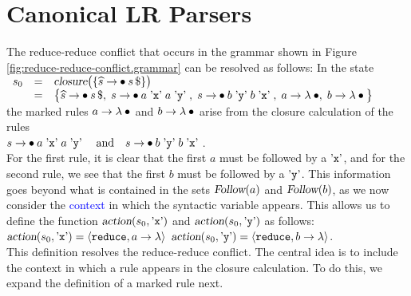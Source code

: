 \section{Canonical LR Parsers}
The reduce-reduce conflict that occurs in the grammar shown in Figure \ref{fig:reduce-reduce-conflict.grammar} can be resolved as follows: In the state
\\[0.2cm]
\hspace*{1.3cm}
$\begin{array}{lcl}
 s_0 & = & \textsl{closure}\bigl( \{ \widehat{s} \rightarrow \mdot s\,\symbol{36} \}\bigr) \\
     & = & \bigl\{ \widehat{s} \rightarrow \mdot s\,\symbol{36},\;
                   s \rightarrow \mdot a \aquoted{x} a \aquoted{y},\;
                   s \rightarrow \mdot b \aquoted{y} b \aquoted{x},\;
                   a \rightarrow \lambda \mdot, \;
                   b \rightarrow \lambda \mdot
            \bigr\}
\end{array}
$
\\[0.2cm]
the marked rules $a \rightarrow \lambda \mdot$ and $b \rightarrow \lambda\mdot$ arise from the closure calculation of the rules 
\\[0.2cm]
\hspace*{1.3cm}
$s \rightarrow \mdot a \aquoted{x} a \aquoted{y} \quad \text{and} \quad 
 s \rightarrow \mdot b \aquoted{y} b \aquoted{x}$.
\\[0.2cm]
For the first rule, it is clear that the first $a$ must be followed by a $\mbox{'\texttt{x}'}$, and for the second rule, we see that the first $b$ must be followed by a $\mbox{'\texttt{y}'}$. This information goes beyond what is contained in the sets $\textsl{Follow}(a)$ and $\textsl{Follow}(b)$, as we now consider the \textcolor{blue}{context} in which the syntactic variable appears. This allows us to define the function $\textsl{action}(s_0, \mbox{'\texttt{x}'})$ and $\textsl{action}(s_0, \mbox{'\texttt{y}'})$ as follows:
\\[0.2cm]
\hspace*{1.3cm}
$\textsl{action}(s_0, \mbox{'\texttt{x}'}) = \langle \texttt{reduce}, a \rightarrow \lambda \rangle$
\quad {} \quad 
$\textsl{action}(s_0, \mbox{'\texttt{y}'}) = \langle \texttt{reduce}, b \rightarrow \lambda \rangle$. 
\\[0.2cm]
This definition resolves the reduce-reduce conflict. The central idea is to include the context in which a rule
appears in the closure calculation. To do this, we expand the definition of a marked rule next.

